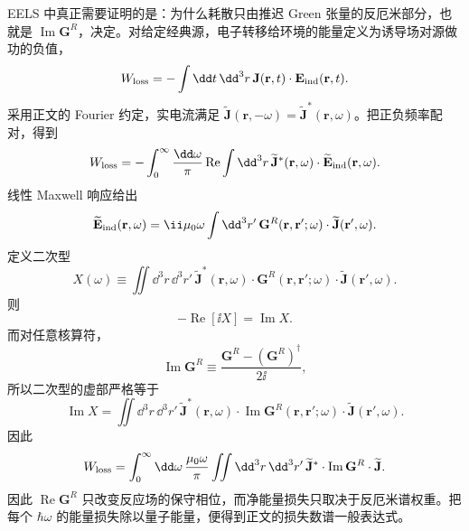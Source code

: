 \begin{derivation}
EELS 中真正需要证明的是：为什么耗散只由推迟 Green 张量的反厄米部分，也就是 \(\operatorname{Im}\mathbf G^R\)，决定。对给定经典源，电子转移给环境的能量定义为诱导场对源做功的负值，
\begin{equation*}
W_{\rm loss}
=-\int\dd t\,\dd^3r\,
\mathbf J(\mathbf r,t)\cdot\mathbf E_{\rm ind}(\mathbf r,t).
\end{equation*}
采用正文的 Fourier 约定，实电流满足
\(\widetilde{\mathbf J}(\mathbf r,-\omega)
=\widetilde{\mathbf J}^{*}(\mathbf r,\omega)\)。把正负频率配对，得到
\begin{equation*}
W_{\rm loss}
=-\int_0^\infty\frac{\dd\omega}{\pi}
\operatorname{Re}
\int\dd^3r\,
\widetilde{\mathbf J}^{*}(\mathbf r,\omega)
\cdot\widetilde{\mathbf E}_{\rm ind}(\mathbf r,\omega).
\end{equation*}
线性 Maxwell 响应给出
\begin{equation*}
\widetilde{\mathbf E}_{\rm ind}(\mathbf r,\omega)
=\ii\mu_0\omega
\int\dd^3r'\,
\mathbf G^R(\mathbf r,\mathbf r';\omega)
\cdot\widetilde{\mathbf J}(\mathbf r',\omega).
\end{equation*}
定义二次型
\begin{equation*}
X(\omega)
\equiv
\iint\dd^3r\,\dd^3r'\,
\widetilde{\mathbf J}^{*}(\mathbf r,\omega)
\cdot\mathbf G^R(\mathbf r,\mathbf r';\omega)
\cdot\widetilde{\mathbf J}(\mathbf r',\omega).
\end{equation*}
则
\begin{equation*}
-\operatorname{Re}[\ii X]
=\operatorname{Im}X.
\end{equation*}
而对任意核算符，
\begin{equation*}
\operatorname{Im}\mathbf G^R
\equiv\frac{\mathbf G^R-(\mathbf G^R)^\dagger}{2\ii},
\end{equation*}
所以二次型的虚部严格等于
\begin{equation*}
\operatorname{Im}X
=\iint\dd^3r\,\dd^3r'\,
\widetilde{\mathbf J}^{*}(\mathbf r,\omega)
\cdot\operatorname{Im}\mathbf G^R(\mathbf r,\mathbf r';\omega)
\cdot\widetilde{\mathbf J}(\mathbf r',\omega).
\end{equation*}
因此
\begin{equation*}
W_{\rm loss}
=\int_0^\infty\dd\omega\,
\frac{\mu_0\omega}{\pi}
\iint\dd^3r\,\dd^3r'\,
\widetilde{\mathbf J}^{*}
\cdot\operatorname{Im}\mathbf G^R
\cdot\widetilde{\mathbf J}.
\end{equation*}
因此 \(\operatorname{Re}\mathbf G^R\) 只改变反应场的保守相位，而净能量损失只取决于反厄米谱权重。把每个 \(\hbar\omega\) 的能量损失除以量子能量，便得到正文的损失数谱一般表达式。


\end{derivation}
